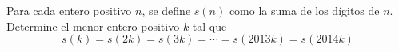 Para cada entero positivo $n$, se define $s(n)$ como la suma de los dígitos de $n$. \newline 
Determine el menor entero positivo $k$ tal que
\[ s(k) = s(2k) = s(3k) = \cdots = s(2013k) = s(2014k) \]


